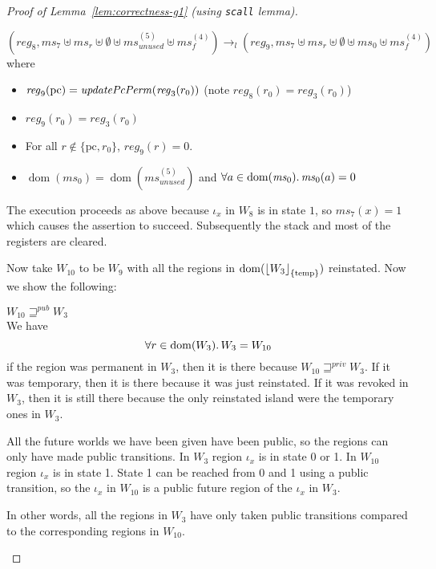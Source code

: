 \documentclass[a4paper]{article}
\DeclarePairedDelimiter\floor{\lfloor}{\rfloor}
\DeclareMathOperator{\dom}{dom}
\newcommand{\var}[1]{\mathit{#1}}
\newcommand{\hs}{\var{ms}}
\newcommand{\ms}{\hs}
\newcommand{\pcreg}{\mathrm{pc}}
\newcommand{\reg}{\var{reg}}
\newcommand{\unused}{\var{unused}}
\newcommand{\plainfun}[2]{
  \ifthenelse{\equal{#2}{}}
  {\mathit{#1}}
  {\mathit{#1}(#2)}
}
\newcommand{\updatePcPerm}[1]{\plainfun{updatePcPerm}{#1}}
\newcommand{\erase}[2]{\floor*{#1}_{\{#2\}}}
\newcommand{\futurewk}{\mathbin{\sqsupseteq}^{\var{pub}}}
\newcommand{\futurestr}{\mathbin{\sqsupseteq}^{\var{priv}}}
\newcommand{\plainview}[1]{\mathrm{#1}}
\newcommand{\temp}{\plainview{temp}}
\newcommand{\step}[1][]{\rightarrow_{#1}}
\begin{document}
\begin{proof}[Proof of Lemma~\ref{lem:correctness-g1} (using \texttt{scall} lemma)]
\begin{enumproof}[resume]
\begin{enumproof}
            \[
              (\reg_8,\ms_7 \uplus \ms_r \uplus \emptyset \uplus \ms_\unused^{(5)} \uplus \ms_f^{(4)}) \step[l] (reg_9,\ms_7 \uplus \ms_r \uplus \emptyset \uplus \ms_0 \uplus \ms_f^{(4)})
            \]
            where
            \begin{itemize}
            \item $\reg_9(\pcreg) = \updatePcPerm{\reg_3(r_0)}$ (note $\reg_8(r_0) = \reg_3(r_0)$)
            \item $\reg_9(r_0) = reg_3(r_0)$
            \item For all $r \not\in \{\pcreg,r_0\}$, $\reg_9(r) = 0$.
            \item $\dom(\ms_0) = \dom(\ms_\unused^{(5)})$ and $\forall a \in \dom(\ms_0) \ldotp \ms_0(a) = 0$
            \end{itemize}
            The execution proceeds as above because $\iota_x$ in $W_8$ is in state $1$, so $\ms_7(x) = 1$ which causes the assertion to succeed. Subsequently the stack and most of the registers are cleared.

            Now take $W_{10}$ to be $W_9$ with all the regions in $\dom(\erase{W_3}{\temp})$ reinstated. Now we show the following:
            \begin{enumproof}
            \item $W_{10} \futurewk W_3$ \label{g1:w10futwkw3}\\
              We have
              \[
                \forall r \in \dom(W_3) \ldotp W_3 = W_{10}
              \]
              if the region was permanent in $W_3$, then it is there because $W_{10} \futurestr W_3$. If it was temporary, then it is there because it was just reinstated. If it was revoked in $W_3$, then it is still there because the only reinstated island were the temporary ones in $W_3$.

              All the future worlds we have been given have been public, so the regions can only have made public transitions. In $W_3$ region $\iota_x$ is in state 0 or 1. In $W_{10}$ region $\iota_x$ is in state 1. State 1 can be reached from 0 and 1 using a public transition, so the $\iota_x$ in $W_{10}$ is a public future region of the $\iota_x$ in $W_3$.

              In other words, all the regions in $W_3$ have only taken public transitions compared to the corresponding regions in $W_{10}$.


\end{enumproof}
\end{enumproof}
\end{enumproof}
\end{proof}
\end{document}
